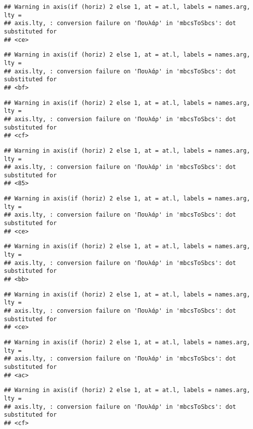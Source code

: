 \documentclass[
]{article}
\begin{document}
\begin{verbatim}
## Warning in axis(if (horiz) 2 else 1, at = at.l, labels = names.arg, lty =
## axis.lty, : conversion failure on 'Πουλάρ' in 'mbcsToSbcs': dot substituted for
## <ce>
\end{verbatim}

\begin{verbatim}
## Warning in axis(if (horiz) 2 else 1, at = at.l, labels = names.arg, lty =
## axis.lty, : conversion failure on 'Πουλάρ' in 'mbcsToSbcs': dot substituted for
## <bf>
\end{verbatim}

\begin{verbatim}
## Warning in axis(if (horiz) 2 else 1, at = at.l, labels = names.arg, lty =
## axis.lty, : conversion failure on 'Πουλάρ' in 'mbcsToSbcs': dot substituted for
## <cf>
\end{verbatim}

\begin{verbatim}
## Warning in axis(if (horiz) 2 else 1, at = at.l, labels = names.arg, lty =
## axis.lty, : conversion failure on 'Πουλάρ' in 'mbcsToSbcs': dot substituted for
## <85>
\end{verbatim}

\begin{verbatim}
## Warning in axis(if (horiz) 2 else 1, at = at.l, labels = names.arg, lty =
## axis.lty, : conversion failure on 'Πουλάρ' in 'mbcsToSbcs': dot substituted for
## <ce>
\end{verbatim}

\begin{verbatim}
## Warning in axis(if (horiz) 2 else 1, at = at.l, labels = names.arg, lty =
## axis.lty, : conversion failure on 'Πουλάρ' in 'mbcsToSbcs': dot substituted for
## <bb>
\end{verbatim}

\begin{verbatim}
## Warning in axis(if (horiz) 2 else 1, at = at.l, labels = names.arg, lty =
## axis.lty, : conversion failure on 'Πουλάρ' in 'mbcsToSbcs': dot substituted for
## <ce>
\end{verbatim}

\begin{verbatim}
## Warning in axis(if (horiz) 2 else 1, at = at.l, labels = names.arg, lty =
## axis.lty, : conversion failure on 'Πουλάρ' in 'mbcsToSbcs': dot substituted for
## <ac>
\end{verbatim}

\begin{verbatim}
## Warning in axis(if (horiz) 2 else 1, at = at.l, labels = names.arg, lty =
## axis.lty, : conversion failure on 'Πουλάρ' in 'mbcsToSbcs': dot substituted for
## <cf>
\end{verbatim}
\end{document}
